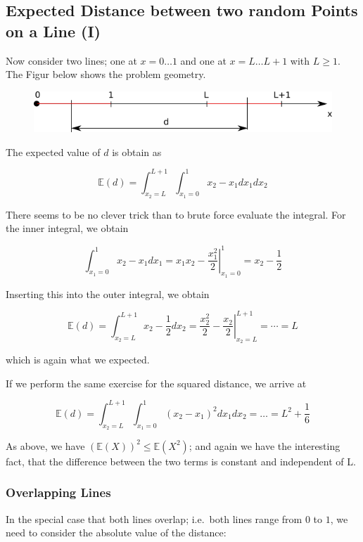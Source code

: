 \subsection{Expected Distance between two random Points on a Line
(I)}\label{expected-distance-between-two-random-points-on-a-line-i}

Now consider two lines; one at \(x=0 \ldots 1\) and one at
\(x=L \ldots L+1\) with \(L \geq 1\). The Figur below shows the problem
geometry.

\begin{figure}
\centering
\includegraphics[scale=0.7]{images/expected_distances_01_02.png}
\end{figure}

The expected value of \(d\) is obtain as

\[
\mathbb{E}(d) = \int_{x_2=L}^{L+1} \int_{x_1=0}^{1} x_2 - x_1 dx_1 dx_2
\]

There seems to be no clever trick than to brute force evaluate the
integral. For the inner integral, we obtain

\[
\int_{x_1=0}^{1} x_2 - x_1 dx_1 = \left. x_1 x_2 - \frac{x_1^2}{2} \right|_{x_1=0}^1 = x_2 - \frac{1}{2}
\]

Inserting this into the outer integral, we obtain

\[
\mathbb{E}(d) = \int_{x_2=L}^{L+1} x_2 - \frac{1}{2} dx_2 = \left. \frac{x_2^2}{2} - \frac{x_2}{2} \right|_{x_2=L}^{L+1} = \cdots = L
\]

which is again what we expected.

If we perform the same exercise for the squared distance, we arrive at

\[
\mathbb{E}(d) = \int_{x_2=L}^{L+1} \int_{x_1=0}^{1} (x_2 - x_1)^2 dx_1 dx_2 = \ldots = L^2 + \frac{1}{6}
\]

As above, we have \((\mathbb{E}(X))^2 \leq \mathbb{E}(X^2)\); and again
we have the interesting fact, that the difference between the two terms
is constant and independent of L.

\subsubsection{Overlapping Lines}

In the special case that both lines overlap; i.e.~both lines range from
\(0\) to \(1\), we need to consider the absolute value of the distance:

